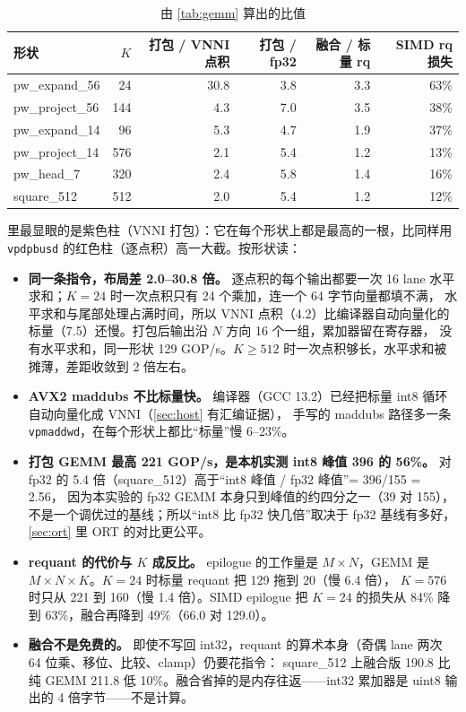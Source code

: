 \documentclass[11pt,a4paper]{ctexart}
\begin{document}
\begin{table}[H]
\centering\small
\caption{由 \cref{tab:gemm} 算出的比值}\label{tab:gemmratio}
\begin{tabular}{lrrrrr}
\toprule
形状 & $K$ & 打包 / VNNI 点积 & 打包 / fp32 & 融合 / 标量 rq & SIMD rq 损失 \\
\midrule
pw\_expand\_56 & 24 & 30.8 & 3.8 & 3.3 & 63\% \\
pw\_project\_56 & 144 & 4.3 & 7.0 & 3.5 & 38\% \\
pw\_expand\_14 & 96 & 5.3 & 4.7 & 1.9 & 37\% \\
pw\_project\_14 & 576 & 2.1 & 5.4 & 1.2 & 13\% \\
pw\_head\_7 & 320 & 2.4 & 5.8 & 1.4 & 16\% \\
square\_512 & 512 & 2.0 & 5.4 & 1.2 & 12\% \\
\bottomrule
\end{tabular}
\end{table}

 里最显眼的是紫色柱（VNNI 打包）：它在每个形状上都是最高的一根，比同样用 \texttt{vpdpbusd} 的红色柱（逐点积）高一大截。按形状读：

\begin{itemize}
  \item \textbf{同一条指令，布局差 2.0--30.8 倍。} 逐点积的每个输出都要一次 16 lane 水平求和；$K=24$ 时一次点积只有 24 个乘加，连一个 64 字节向量都填不满，
        水平求和与尾部处理占满时间，所以 VNNI 点积（4.2）比编译器自动向量化的标量（7.5）还慢。打包后输出沿 $N$ 方向 16 个一组，累加器留在寄存器，
        没有水平求和，同一形状 129 GOP/s。$K\ge 512$ 时一次点积够长，水平求和被摊薄，差距收敛到 2 倍左右。
  \item \textbf{AVX2 maddubs 不比标量快。} 编译器（GCC 13.2）已经把标量 int8 循环自动向量化成 VNNI（\cref{sec:host} 有汇编证据），
        手写的 maddubs 路径多一条 \texttt{vpmaddwd}，在每个形状上都比“标量”慢 6--23\%。
  \item \textbf{打包 GEMM 最高 221 GOP/s，是本机实测 int8 峰值 396 的 56\%。} 对 fp32 的 5.4 倍（square\_512）高于“int8 峰值 / fp32 峰值”= 396/155 = 2.56，
        因为本实验的 fp32 GEMM 本身只到峰值的约四分之一（39 对 155），不是一个调优过的基线；所以“int8 比 fp32 快几倍”取决于 fp32 基线有多好，
        \cref{sec:ort} 里 ORT 的对比更公平。
  \item \textbf{requant 的代价与 $K$ 成反比。} epilogue 的工作量是 $M\times N$，GEMM 是 $M\times N\times K$。$K=24$ 时标量 requant 把 129 拖到 20（慢 6.4 倍），
        $K=576$ 时只从 221 到 160（慢 1.4 倍）。SIMD epilogue 把 $K=24$ 的损失从 84\% 降到 63\%，融合再降到 49\%（66.0 对 129.0）。
  \item \textbf{融合不是免费的。} 即使不写回 int32，requant 的算术本身（奇偶 lane 两次 64 位乘、移位、比较、clamp）仍要花指令：
        square\_512 上融合版 190.8 比纯 GEMM 211.8 低 10\%。融合省掉的是内存往返——int32 累加器是 uint8 输出的 4 倍字节——不是计算。
\end{itemize}
\end{document}
